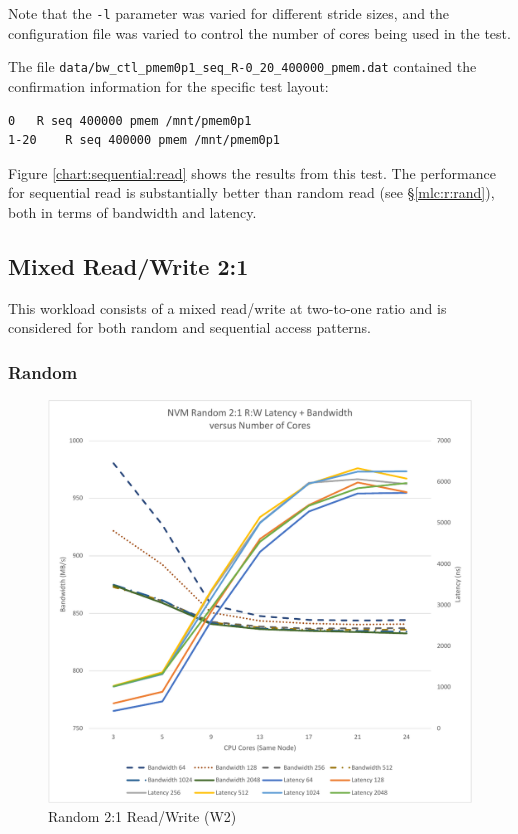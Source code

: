Note that the \verb+-l+ parameter was varied for different
stride sizes, and the configuration file was varied to control
the number of cores being used in the test.

The file \verb+data/bw_ctl_pmem0p1_seq_R-0_20_400000_pmem.dat+ contained the confirmation information
for the specific test layout:

\begin{verbatim}
0	R seq 400000 pmem /mnt/pmem0p1
1-20	R seq 400000 pmem /mnt/pmem0p1
\end{verbatim}

Figure \ref{chart:sequential:read} shows the results from this test.
The performance for sequential read is substantially better than
random read (see \S \ref{mlc:r:rand}), both in terms of bandwidth
and latency.

\subsection{Mixed Read/Write 2:1}

This workload consists of a mixed read/write at two-to-one ratio and
is considered for both random and sequential access patterns.

\subsubsection{Random}

\begin{figure}
    \centering
    \caption{Random 2:1 Read/Write (W2)}\label{chart:random:W2}
    \includegraphics[scale=0.5]{charts/random-w2-crop.pdf}
\end{figure}

